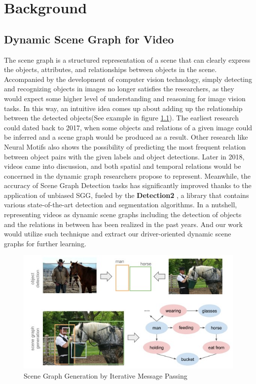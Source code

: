 

\chapter{Background}\label{chapter:background}

\section{Dynamic Scene Graph for Video}
The scene graph is a structured representation of a scene that can clearly express the objects, attributes, and relationships between objects in the scene\cite{9661322}. Accompanied by the development of computer vision technology, simply detecting and recognizing objects in images no longer satisfies the researchers, as they would expect some higher level of understanding and reasoning for image vision tasks. In this way, an intuitive idea comes up about adding up the relationship between the detected objects(See example in figure \ref{fig:SGG}). The earliest research could dated back to 2017, when some objects and relations of a given image could be inferred and a scene graph would be produced as a result\cite{xu2017scene}. Other research like Neural Motifs\cite{zellers2018neural} also shows the possibility of predicting the most frequent relation between object pairs with the given labels and object detections. Later in 2018, videos came into discussion, and both spatial and temporal relations would be concerned in the dynamic graph researchers propose to represent\cite{wang2018videos}. Meanwhile, the accuracy of Scene Graph Detection tasks has significantly improved thanks to the application of unbiased SGG\cite{wang2018videos}, fueled by the \textbf{Detection2} \cite{wu2019detectron2}, a library that contains various state-of-the-art detection and segmentation algorithms. In a nutshell, representing videos as dynamic scene graphs including the detection of objects and the relations in between has been realized in the past years. And our work would utilize such technique and extract our driver-oriented dynamic scene graphs for further learning.

\begin{figure}
    \centering
    \includegraphics[width=0.8\linewidth]{figures/SGG.jpg}
    \caption{Scene Graph Generation by Iterative Message Passing}
    \label{fig:SGG}
\end{figure}


